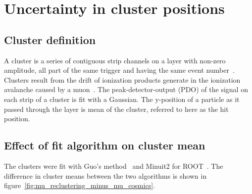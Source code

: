 

\chapter[Cluster position uncertainty]{Uncertainty in cluster positions}
\label{appendix:clustering}


\section{Cluster definition}
\label{sec:appendix_clustering_cluster_def}
A cluster is a series of contiguous strip channels on a layer with non-zero amplitude, all part of the same trigger and having the same event number~\cite{lefebvre_thesis}. Clusters result from the drift of ionization products generate in the ionization avalanche caused by a muon~\cite{townsend_electricity_1915}. The peak-detector-output (PDO) of the signal on each strip of a cluster is fit with a Gaussian. The y-position of a particle as it passed through the layer is mean of the cluster, referred to here as the hit position.

\section{Effect of fit algorithm on cluster mean}
\label{sec:appendix_clustering_cluster_fit}
The clusters were fit with Guo's method~\cite{guo_simple_2011} and Minuit2 for ROOT~\cite{hatlo_developments_2005}. The difference in cluster means between the two algorithms is shown in figure~\ref{fig:mu_reclustering_minus_mu_cosmics}.

